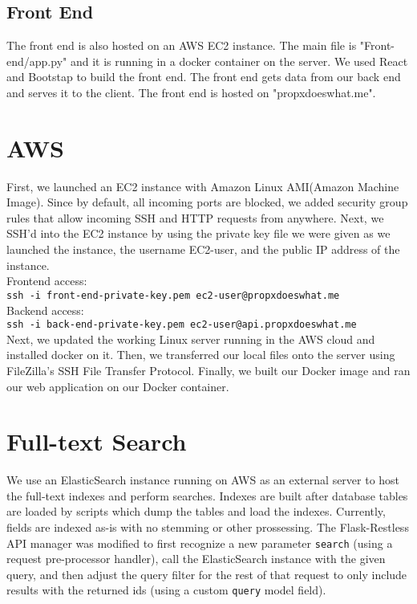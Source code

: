 \documentclass[12pt]{article}
\newcommand{\code}[1]{\texttt{#1}}
\begin{document}
\subsection{Front End}

The front end is also hosted on an AWS EC2 instance. The main file is "Front-end/app.py" and it is running in a docker container on the server. We used React and Bootstap to build the front end. The front end gets data from our back end and serves it to the client. The front end is hosted on "propxdoeswhat.me".

\section{AWS}

First, we launched an EC2 instance with Amazon Linux AMI(Amazon Machine Image). Since by default, all incoming ports are blocked, we added security group rules that allow incoming SSH and HTTP requests from anywhere. Next, we SSH'd into the EC2 instance by using the private key file we were given as we launched the instance, the username EC2-user, and the public IP address of the instance. \\

Frontend access: \\
\code{ssh -i front-end-private-key.pem ec2-user@propxdoeswhat.me} \\
Backend access: \\
\code{ssh -i back-end-private-key.pem ec2-user@api.propxdoeswhat.me} \\

Next, we updated the working Linux server running in the AWS cloud and installed docker on it. Then, we transferred our local files onto the server using FileZilla's SSH File Transfer Protocol. Finally, we built our Docker image and ran our web application on our Docker container.

\section{Full-text Search}

We use an ElasticSearch instance running on AWS as an external server to host the full-text indexes and perform searches. Indexes are built after database tables are loaded by scripts which dump the tables and load the indexes. Currently, fields are indexed as-is with no stemming or other prossessing. The Flask-Restless API manager was modified to first recognize a new parameter \code{search} (using a request pre-processor handler), call the ElasticSearch instance with the given query, and then adjust the query filter for the rest of that request to only include results with the returned ids (using a custom \code{query} model field).
\end{document}
